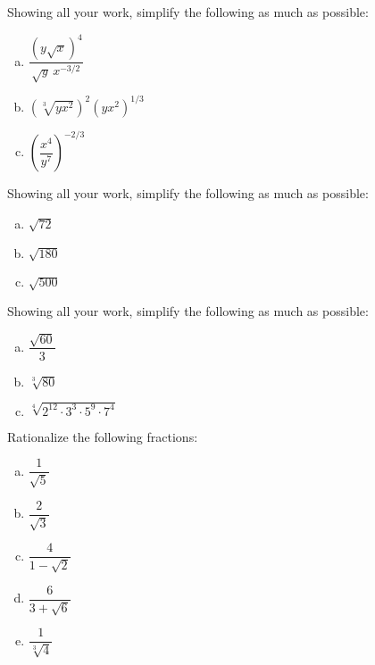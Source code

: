 \documentclass[11pt,letterpaper]{article}
\begin{document}
\newpage



 Showing all your work, simplify the following as much as possible:
\begin{enumerate}[(a)]
\item $\dfrac{(y \sqrt{x})^4}{\sqrt{y}\, x^{-3/2}}$
\item $(\sqrt[3]{y x^2})^2 (yx^2)^{1/3}$
\item $\left( \dfrac{x^4}{y^7} \right)^{-2/3}$
\end{enumerate}



\newpage



 Showing all your work, simplify the following as much as possible:
\begin{enumerate}[(a)]
\item $\sqrt{72}$
\item $\sqrt{180}$
\item $\sqrt{500}$
\end{enumerate}



\newpage



 Showing all your work, simplify the following as much as possible:
\begin{enumerate}[(a)]
\item $\dfrac{\sqrt{60}}{3}$
\item $\sqrt[3]{80}$
\item $\sqrt[4]{2^{12} \cdot 3^3 \cdot 5^9 \cdot 7^4}$
\end{enumerate}



\newpage



 Rationalize the following fractions:
\begin{enumerate}[(a)]
\item $\dfrac{1}{\sqrt{5}}$
\item $\dfrac{2}{\sqrt{3}}$
\item $\dfrac{4}{1 - \sqrt{2}}$
\item $\dfrac{6}{3 + \sqrt{6}}$
\item $\dfrac{1}{\sqrt[3]{4}}$
\end{enumerate}
\end{document}
